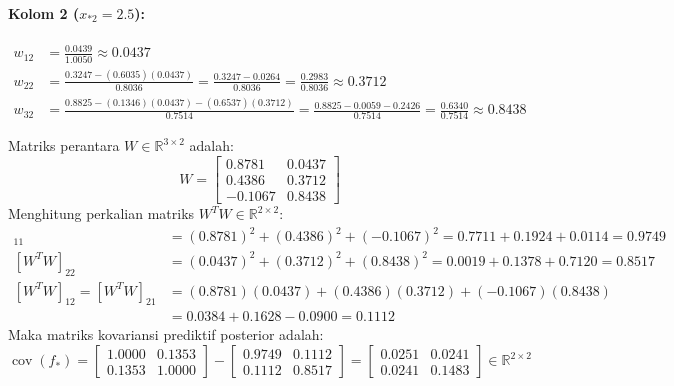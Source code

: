\documentclass[11pt,a4paper]{article}
\def\mathbf#1{#1}%
\begin{document}
\paragraph{Kolom 2 ($x_{*2} = 2.5$):}
\begin{align*}
w_{12} &= \frac{0.0439}{1.0050} \approx \mathbf{0.0437} \\
w_{22} &= \frac{0.3247 - (0.6035)(0.0437)}{0.8036} = \frac{0.3247 - 0.0264}{0.8036} = \frac{0.2983}{0.8036} \approx \mathbf{0.3712} \\
w_{32} &= \frac{0.8825 - (0.1346)(0.0437) - (0.6537)(0.3712)}{0.7514} = \frac{0.8825 - 0.0059 - 0.2426}{0.7514} = \frac{0.6340}{0.7514} \approx \mathbf{0.8438}
\end{align*}

Matriks perantara $W \in \mathbb{R}^{3 \times 2}$ adalah:
\begin{equation}
W = \begin{bmatrix}
0.8781 & 0.0437 \\
0.4386 & 0.3712 \\
-0.1067 & 0.8438
\end{bmatrix}
\end{equation}
Menghitung perkalian matriks $W^T W \in \mathbb{R}^{2 \times 2}$:
\begin{align*}
[W^T W]_{11} &= (0.8781)^2 + (0.4386)^2 + (-0.1067)^2 = 0.7711 + 0.1924 + 0.0114 = \mathbf{0.9749} \\
[W^T W]_{22} &= (0.0437)^2 + (0.3712)^2 + (0.8438)^2 = 0.0019 + 0.1378 + 0.7120 = \mathbf{0.8517} \\
[W^T W]_{12} = [W^T W]_{21} &= (0.8781)(0.0437) + (0.4386)(0.3712) + (-0.1067)(0.8438) \\
&= 0.0384 + 0.1628 - 0.0900 = \mathbf{0.1112}
\end{align*}
Maka matriks kovariansi prediktif posterior adalah:
\begin{equation}
\operatorname{cov}(\mathbf{f}_*) = \begin{bmatrix} 1.0000 & 0.1353 \\ 0.1353 & 1.0000 \end{bmatrix} - \begin{bmatrix} 0.9749 & 0.1112 \\ 0.1112 & 0.8517 \end{bmatrix} = \begin{bmatrix}
\mathbf{0.0251} & 0.0241 \\
0.0241 & \mathbf{0.1483}
\end{bmatrix} \in \mathbb{R}^{2 \times 2}
\end{equation}
\end{document}
